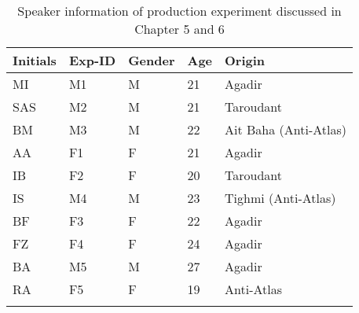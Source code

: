 \begin{table}
\caption{Speaker information of production experiment discussed in Chapter 5 and 6}
\label{Table A2}
\begin{tabular}{lllll}
\lsptoprule
\textbf{Initials}                              & \textbf{Exp-ID} & \textbf{Gender} & \textbf{Age} & \textbf{Origin}                \\
\midrule
MI                                    & M1     & M      & 21  & Agadir                \\
SAS                                   & M2     & M      & 21  & Taroudant             \\
BM                                    & M3     & M      & 22  & Ait Baha (Anti-Atlas) \\
AA                                    & F1     & F      & 21  & Agadir                \\
IB                                    & F2     & F      & 20  & Taroudant             \\
IS                                    & M4     & M      & 23  & Tighmi (Anti-Atlas)   \\
BF                                    & F3     & F      & 22  & Agadir                \\
FZ                                    & F4     & F      & 24  & Agadir                \\
BA                                    & M5     & M      & 27  & Agadir                \\
RA                                    & F5     & F      & 19  & Anti-Atlas           \\
\lspbottomrule
\end{tabular}
\end{table}

